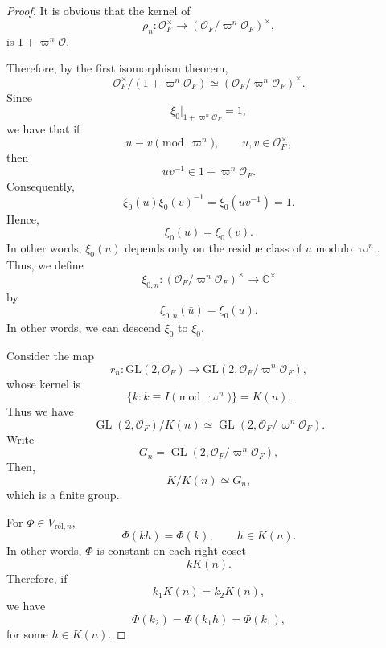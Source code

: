 \documentclass[11pt]{amsart}
\renewcommand{\rm}{\mathrm}
\newcommand{\GGL}{\mathrm{GL}}
\theoremstyle{definition}
\numberwithin{equation}{section}
\begin{document}
	\begin{proof}
		It is obvious that the kernel of
		\[
		\rho_n : \mathcal{O}_F^\times \longrightarrow (\mathcal{O}_F/\varpi^n\mathcal{O}_F)^\times,
		\]is
		\(1 + \varpi^n\mathcal{O}.\)
		
		
		Therefore, by the first isomorphism theorem,
		\[
		\mathcal{O}_F^\times / (1 + \varpi^n\mathcal{O}_F) \simeq (\mathcal{O}_F/\varpi^n\mathcal{O}_F)^\times.
		\]
		Since
		\[
		\xi_0|_{1+\varpi^n\mathcal{O}_F} = 1,
		\]
		we have that if
		\[
		u \equiv v \pmod{\varpi^n}, \qquad u, v \in \mathcal{O}_F^\times,
		\]
		then
		\[
		uv^{-1} \in 1 + \varpi^n\mathcal{O}_F.
		\]
		Consequently,
		\[
		\xi_0(u)\xi_0(v)^{-1} = \xi_0(uv^{-1}) = 1.
		\]Hence,
		\[
		\xi_0(u) = \xi_0(v).
		\]
		In other words, \(\xi_0(u)\) depends only on the residue class of \(u\) modulo \(\varpi^n\). Thus, we define
		\[
		\xi_{0,n} : (\mathcal{O}_F/\varpi^n\mathcal{O}_F)^\times \longrightarrow \mathbb{C}^\times
		\]
		by
		\[
		\xi_{0,n}(\bar{u}) = \xi_0(u).
		\]In other words, we can descend \(\xi_0\) to \(\bar{\xi}_0\).
		
		
		Consider the map
		\[r_n:\GGL(2,\mathcal{O}_F)\rightarrow \GGL(2,\mathcal{O}_F/\varpi^n\mathcal{O}_F),\]whose kernel is
		\[\{k:k \equiv I \pmod{\varpi^n}\}=K(n).\]
		Thus we have
		\[
		\operatorname{GL}(2,\mathcal{O}_F) / K(n) \simeq \operatorname{GL}(2,\mathcal{O}_F / \varpi^n \mathcal{O}_F).
		\]
		Write
		\[
		G_n = \operatorname{GL}(2,\mathcal{O}_F / \varpi^n \mathcal{O}_F),
		\]
		Then,
		\[
		K / K(n) \simeq G_n,
		\]which is a finite group.
		
		
		For \(\Phi\in V_{\rm{rel},n}\),
		\[
		\Phi(kh) = \Phi(k), \qquad h \in K(n).
		\]
		In other words, \(\Phi\) is constant on each right coset
		\[
		kK(n).
		\]
		Therefore, if
		\[
		k_1K(n) = k_2K(n),
		\]we have
		\[
		\Phi(k_2) = \Phi(k_1h) = \Phi(k_1),
		\]for some \(h \in K(n)\).
		

\end{proof}
\end{document}
